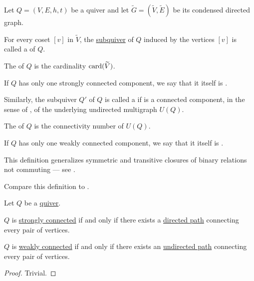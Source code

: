 \begin{definition}\label{def:quiver_connectedness}
  Let \( Q = (V, E, h, t) \) be a quiver and let \( \widetilde{G} = (\widetilde{V}, \widetilde{E}) \) be its condensed directed graph.

  \begin{thmenum}
     For every coset \( [v] \) in \( \widetilde{V} \), the \hyperref[def:hypergraph/submodel]{subquiver} of \( Q \) induced by the vertices \( [v] \) is called a  of \( Q \).

    The  of \( Q \) is the cardinality \( \operatorname{card}(\widetilde{V}) \).

    If \( Q \) has only one strongly connected component, we say that it itself is .

     Similarly, the subquiver \( Q' \) of \( Q \) is called a  if is a connected component, in the sense of , of the underlying undirected multigraph \( U(Q) \).

    The  of \( Q \) is the connectivity number of \( U(Q) \).

    If \( Q \) has only one weakly connected component, we say that it itself is .
  \end{thmenum}

  This definition generalizes symmetric and transitive closures of binary relations not commuting --- see .

  Compare this definition to .
\end{definition}

\begin{proposition}\label{thm:quiver_connectedness_via_chains}
  Let \( Q \) be a \hyperref[def:quiver]{quiver}.

  \begin{thmenum}
     \( Q \) is \hyperref[def:quiver_connectedness/strong]{strongly connected} if and only if there exists a \hyperref[def:quiver_path/directed]{directed path} connecting every pair of vertices.

     \( Q \) is \hyperref[def:quiver_connectedness/weak]{weakly connected} if and only if there exists an \hyperref[def:quiver_path/undirected]{undirected path} connecting every pair of vertices.
  \end{thmenum}
\end{proposition}
\begin{proof}
  Trivial.
\end{proof}

